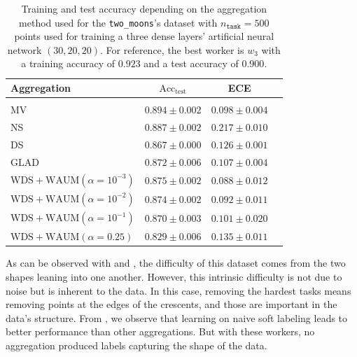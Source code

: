 \begin{table}[thb]
    \centering
    \caption{Training and test accuracy depending on the aggregation method used for the \texttt{two\_moons}'s dataset with $n_\texttt{task}=500$ points used for training a three dense layers' artificial neural network $(30, 20, 20)$. For reference, the best worker is $w_3$ with a training accuracy of $0.923$ and a test accuracy of $0.900$. }
        \begin{tabular}{lccc}
            Aggregation                                  & $\mathrm{Acc}_{\text{test}}$ & ECE
            \\ \hline \\
            MV                                                           & $\mathbf{0.894\pm 0.002}$    & $\mathbf{0.098}\pm 0.004$ \\
            NS                                                             & $0.887\pm 0.002$    & $0.217\pm 0.010$          \\
            DS                                                         & $0.867\pm 0.000$             & $0.126\pm 0.001$          \\
            $\mathrm{GLAD}$                                                  & $0.872\pm 0.006$             & $0.107\pm 0.004$          \\
             \rowcolor{gray!20}$\mathrm{WDS}+\mathrm{WAUM}(\alpha=10^{-3}) $                     & $0.875\pm 0.002$             & $0.088\pm 0.012$ \\
             \rowcolor{gray!20}$\mathrm{WDS}+\mathrm{WAUM}(\alpha=10^{-2})$                  & $0.874\pm 0.002$             & $0.092\pm 0.011$ \\
             \rowcolor{gray!20}$\mathrm{WDS}+\mathrm{WAUM}(\alpha=10^{-1})$                    & $0.870\pm 0.003$             & $0.101\pm 0.020$          \\
             \rowcolor{gray!20}$\mathrm{WDS}+\mathrm{WAUM}(\alpha=0.25)$                     & $0.829\pm 0.006$             & $0.135\pm 0.011$          \\
        \end{tabular}
    \label{tab:results_simu_moons}
\end{table}
As can be observed with  and , the difficulty of this dataset comes from the two shapes leaning into one another.
However, this intrinsic difficulty is not due to noise but is inherent to the data.
In this case, removing the hardest tasks means removing points at the edges of the crescents, and those are important in the data's structure.
From , we observe that learning on naive soft labeling leads to better performance than other aggregations.
But with these workers, no aggregation produced labels capturing the shape of the data.

